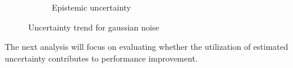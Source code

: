 \begin{figure}[h]
\begin{subfigure}{.5\textwidth}
		\caption{Epistemic uncertainty}
		\label{fig:gn_epistemic}
	\end{subfigure}
	\caption{Uncertainty trend for gaussian noise}
	\label{fig:gn_uncertainty}
\end{figure}


The next analysis will focus on evaluating whether the utilization of estimated uncertainty contributes to performance improvement.